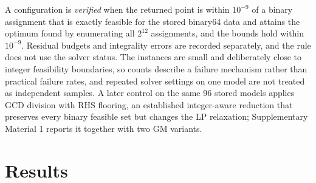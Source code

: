 \documentclass[11pt]{article}
\theoremstyle{definition}
\theoremstyle{remark}
\begin{document}
A configuration is \emph{verified} when the returned point is within $10^{-9}$ of a binary
assignment that is exactly feasible for the stored binary64 data and attains the optimum found
by enumerating all $2^{12}$ assignments, and the bounds hold within $10^{-9}$. Residual budgets
and integrality errors are recorded separately, and the rule does not use the solver status.
The instances are small and deliberately close to integer feasibility boundaries, so counts
describe a failure mechanism rather than practical failure rates, and repeated solver settings
on one model are not treated as independent samples. A later control on the same 96 stored
models applies GCD division with RHS flooring, an established integer-aware reduction that
preserves every binary feasible set but changes the LP relaxation; Supplementary Material 1 reports it
together with two GM variants.

\section{Results}
\label{sec:results}
\end{document}
